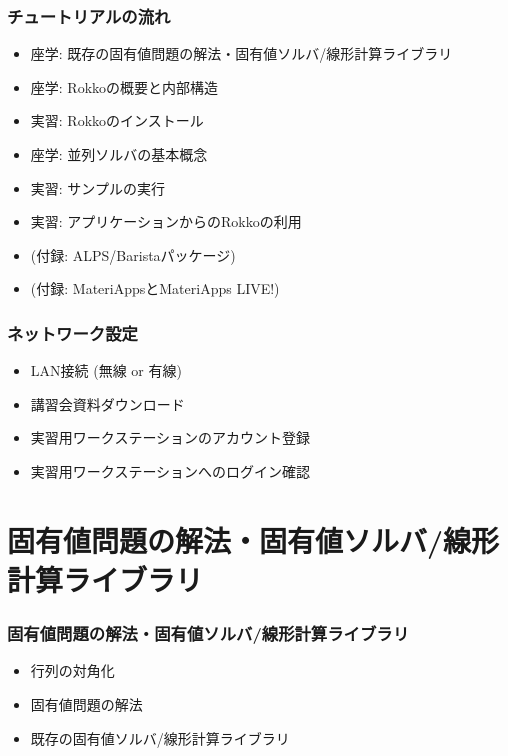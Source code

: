 \begin{frame}
  \frametitle{チュートリアルの流れ}
  \begin{itemize}
  \item 座学: 既存の固有値問題の解法・固有値ソルバ/線形計算ライブラリ
  \item 座学: Rokkoの概要と内部構造
  \item 実習: Rokkoのインストール
  \item 座学: 並列ソルバの基本概念
  \item 実習: サンプルの実行
  \item 実習: アプリケーションからのRokkoの利用
  \item (付録: ALPS/Baristaパッケージ)
  \item (付録: MateriAppsとMateriApps LIVE!)
  \end{itemize}
\end{frame}

\begin{frame}
  \frametitle{ネットワーク設定}
  \begin{itemize}
    \setlength{\itemsep}{1em}
  \item LAN接続 (無線 or 有線)
  \item 講習会資料ダウンロード
  \item 実習用ワークステーションのアカウント登録
  \item 実習用ワークステーションへのログイン確認
  \end{itemize}
\end{frame}

\section{固有値問題の解法・固有値ソルバ/線形計算ライブラリ}

\begin{frame}
  \frametitle{固有値問題の解法・固有値ソルバ/線形計算ライブラリ}
  \begin{itemize}
    \setlength{\itemsep}{1em}
  \item 行列の対角化
  \item 固有値問題の解法
  \item 既存の固有値ソルバ/線形計算ライブラリ
  \end{itemize}
\end{frame}

